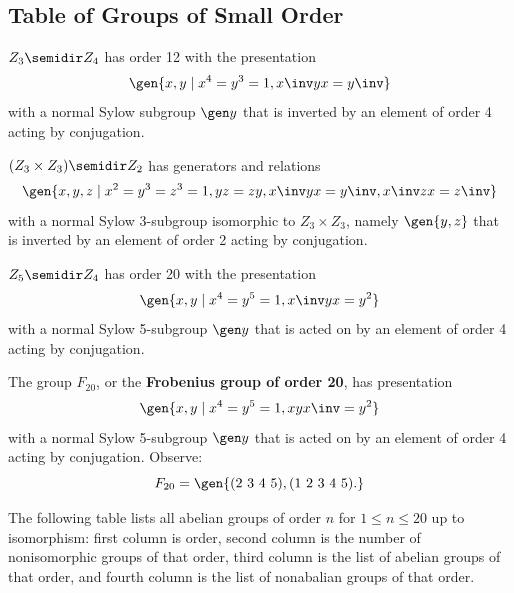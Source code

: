 \newpage

\subsection{Table of Groups of Small Order}

\begin{defn}
    \item $Z_3 \semidir Z_4$ has order 12 with the presentation
    \[\gen{x, y \mid x^4 = y^3 = 1, x\inv yx = y\inv}\]
    with a normal Sylow subgroup $\gen y$ that is inverted by an element of order 4 acting by conjugation.
    \item $(Z_3 \times Z_3) \semidir Z_2$ has generators and relations
    \[\gen{x, y, z \mid x^2 = y^3 = z^3 = 1, yz = zy, x\inv yx = y\inv, x\inv zx = z\inv}\]
    with a normal Sylow 3-subgroup isomorphic to $Z_3 \times Z_3$, namely $\gen{y, z}$ that is inverted by an element of order 2 acting by conjugation.
    \item $Z_5 \semidir Z_4$ has order 20 with the presentation
    \[\gen{x, y \mid x^4 = y^5 = 1, x\inv yx = y^2}\]
    with a normal Sylow 5-subgroup $\gen y$ that is acted on by an element of order 4 acting by conjugation.
    \item The group $F_{20}$, or the \textbf{Frobenius group of order 20}, has presentation
    \[\gen{x, y \mid x^4 = y^5 = 1, xyx\inv  = y^2}\]
    with a normal Sylow 5-subgroup $\gen y$ that is acted on by an element of order 4 acting by conjugation. Observe:
    \[F_{20} = \gen{(2\ 3\ 4\ 5), (1\ 2\ 3\ 4\ 5).}\]
\end{defn}
The following table lists all abelian groups of order $n$ for $1 \leq n \leq 20$ up to isomorphism: first column is order, second column is the number of nonisomorphic groups of that order, third column is the list of abelian groups of that order, and fourth column is the list of nonabalian groups of that order.
